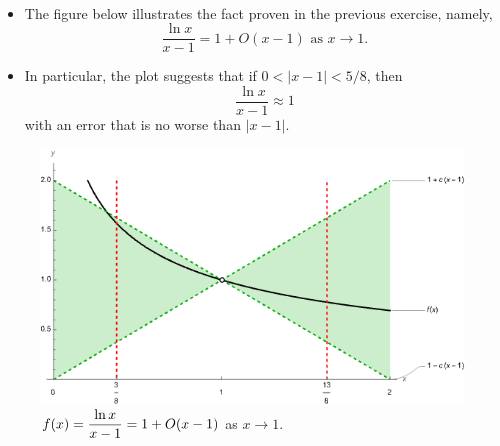 \begin{remark}\,
\begin{itemize}
\item The figure below illustrates the fact proven in the previous exercise, namely,
\begin{equation*}
\frac{\ln x}{x-1} = 1 + O(x-1) \text{ as } x\to 1.
\end{equation*}
\item In particular, the plot suggests that if $0<|x-1|<5/8$, then
\begin{equation*}
\frac{\ln x}{x-1} \approx 1
\end{equation*}
with an error that is no worse than $|x-1|$.
\end{itemize}
\end{remark}

\begin{figure}[H]
\includegraphics[width=6.5in]{img/power_series_and_limits1}
\caption{$f(x)=\displaystyle\frac{\ln x}{x-1} = 1 + O(x-1)$ as $x\to 1$.}
\end{figure}

\newpage

